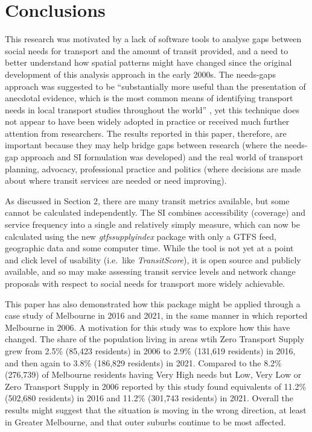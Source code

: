\documentclass[preprint, 3p,
authoryear]{elsarticle} %
\begin{document}
\section{Conclusions}\label{conclusions}

This research was motivated by a lack of software tools to analyse gaps
between social needs for transport and the amount of transit provided,
and a need to better understand how spatial patterns might have changed
since the original development of this analysis approach in the early
2000s. The needs-gaps approach was suggested to be ``substantially more
useful than the presentation of anecdotal evidence, which is the most
common means of identifying transport needs in local transport studies
throughout the world'' \citep{currie2010identifying}, yet this technique
does not appear to have been widely adopted in practice or received much
further attention from researchers. The results reported in this paper,
therefore, are important because they may help bridge gaps between
research (where the needs-gap approach and SI formulation was developed)
and the real world of transport planning, advocacy, professional
practice and politics (where decisions are made about where transit
services are needed or need improving).

As discussed in Section 2, there are many transit metrics available, but
some cannot be calculated independently. The SI combines accessibility
(coverage) and service frequency into a single and relatively simply
measure, which can now be calculated using the new
\emph{gtfssupplyindex} package with only a GTFS feed, geographic data
and some computer time. While the tool is not yet at a point and click
level of usability (i.e.~like \emph{TransitScore}), it is open source
and publicly available, and so may make assessing transit service levels
and network change proposals with respect to social needs for transport
more widely achievable.

This paper has also demonstrated how this package might be applied
through a case study of Melbourne in 2016 and 2021, in the same manner
in which \citet{currie2010identifying} reported Melbourne in 2006. A
motivation for this study was to explore how this have changed. The
share of the population living in areas wtih Zero Transport Supply grew
from 2.5\% (85,423 residents) in 2006 to 2.9\% (131,619 residents) in
2016, and then again to 3.8\% (186,829 residents) in 2021. Compared to
the 8.2\% (276,739) of Melbourne residents having Very High needs but
Low, Very Low or Zero Transport Supply in 2006 reported by
\citet{currie2010identifying} this study found equivalents of 11.2\%
(502,680 residents) in 2016 and 11.2\% (301,743 residents) in 2021.
Overall the results might suggest that the situation is moving in the
wrong direction, at least in Greater Melbourne, and that outer suburbs
continue to be most affected.
\end{document}
